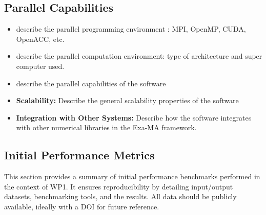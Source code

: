 \subsection{Parallel Capabilities}
\label{sec:WP1:Feelpp:performances}


\begin{itemize}
    \item describe the parallel programming  environment : MPI, OpenMP, CUDA, OpenACC, etc.
    \item describe the parallel computation environment: type of architecture and super computer used.
    \item describe the parallel capabilities of the software
    \item \textbf{Scalability:} Describe the general scalability properties of the software
    \item \textbf{Integration with Other Systems:} Describe how the software integrates with other numerical libraries in the Exa-MA framework.
\end{itemize}


\subsection{Initial Performance Metrics}
\label{sec:WP1:Feelpp:metrics}

This section provides a summary of initial performance benchmarks performed in the context of WP1. It ensures reproducibility by detailing input/output datasets, benchmarking tools, and the results. All data should be publicly available, ideally with a DOI for future reference.

